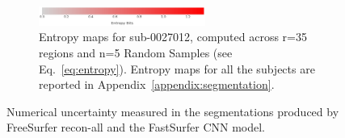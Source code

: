 \begin{figure}
\begin{subfigure}[b]{\linewidth}
\begin{tabular}{c c}
  \end{tabular}
  \centering
  \includegraphics[width=0.6\textwidth]{figures3/entropy_colorbar.eps}
  \caption{Entropy maps for sub-0027012, computed across r=35 regions and n=5 Random Samples (see Eq.~\ref{eq:entropy}). Entropy maps for all the subjects are reported in Appendix~\ref{appendix:segmentation}.}
  \label{tbl:entropy}
  \end{subfigure}
  \caption{Numerical uncertainty measured in the segmentations produced by FreeSurfer recon-all and the FastSurfer CNN model. } 
\end{figure}